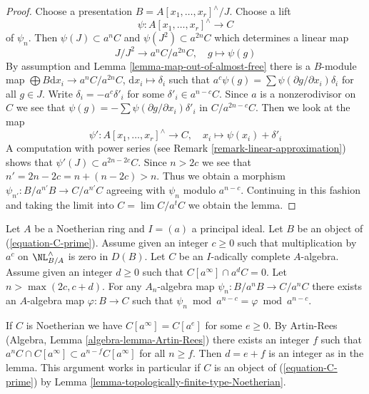 \begin{proof}
Choose a presentation $B = A[x_1, \ldots, x_r]^\wedge/J$. Choose
a lift
$$
\psi : A[x_1, \ldots, x_r]^\wedge \to C
$$
of $\psi_n$. Then $\psi(J) \subset a^nC$ and $\psi(J^2) \subset a^{2n}C$
which determines a linear map
$$
J/J^2 \longrightarrow a^nC/a^{2n}C,\quad g \longmapsto \psi(g)
$$
By assumption and Lemma \ref{lemma-map-out-of-almost-free}
there is a $B$-module map
$\bigoplus B\text{d}x_i \to a^nC/a^{2n}C$,
$\text{d}x_i \mapsto \delta_i$ such that
$a^c \psi(g) = \sum \psi(\partial g/\partial x_i) \delta_i$
for all $g \in J$. Write $\delta_i = - a^c \delta'_i$ for some
$\delta'_i \in a^{n - c}C$. Since $a$ is a nonzerodivisor
on $C$ we see that $\psi(g) = - \sum \psi(\partial g/\partial x_i) \delta'_i$
in $C/a^{2n - c}C$.
Then we look at the map
$$
\psi' : A[x_1, \ldots, x_r]^\wedge \to C,\quad
x_i \longmapsto \psi(x_i) + \delta'_i
$$
A computation with power series (see Remark \ref{remark-linear-approximation})
shows that $\psi'(J) \subset a^{2n - 2c}C$. Since $n > 2c$
we see that $n' = 2n - 2c = n + (n - 2c) > n$. Thus we obtain a morphism
$\psi_{n'} : B/a^{n'}B \to C/a^{n'}C$ agreeing with $\psi_n$ modulo
$a^{n - c}$. Continuing in this fashion and taking the limit
into $C = \lim C/a^tC$ we obtain the lemma.
\end{proof}

\begin{lemma}
\label{lemma-get-morphism-principal}
Let $A$ be a Noetherian ring and $I = (a)$ a principal ideal.
Let $B$ be an object of (\ref{equation-C-prime}).
Assume given an integer $c \geq 0$ such that
multiplication by $a^c$ on $\NL^\wedge_{B/A}$ is zero in $D(B)$.
Let $C$ be an $I$-adically complete $A$-algebra.
Assume given an integer $d \geq 0$ such that $C[a^\infty] \cap a^dC = 0$.
Let $n > \max(2c, c + d)$. For any $A_n$-algebra map
$\psi_n : B/a^nB \to C/a^nC$ there exists an $A$-algebra map
$\varphi : B \to C$ such
that $\psi_n \bmod a^{n - c} = \varphi \bmod a^{n - c}$.
\end{lemma}

\noindent
If $C$ is Noetherian we have $C[a^\infty] = C[a^e]$ for some
$e \geq 0$. By Artin-Rees (Algebra, Lemma \ref{algebra-lemma-Artin-Rees})
there exists an integer $f$ such that
$a^nC \cap C[a^\infty] \subset a^{n - f}C[a^\infty]$ for all $n \geq f$.
Then $d = e + f$ is an integer as in the lemma. This argument
works in particular if $C$ is an object of (\ref{equation-C-prime})
by Lemma \ref{lemma-topologically-finite-type-Noetherian}.

